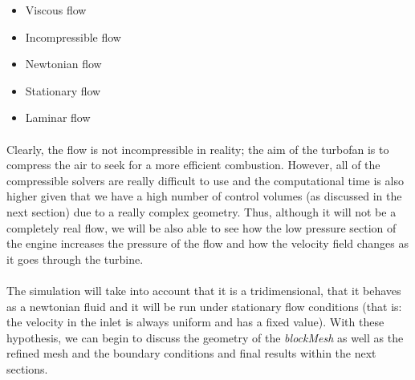 \begin{itemize}
	\item Viscous flow
	\item Incompressible flow
	\item Newtonian flow
	\item Stationary flow
	\item Laminar flow
\end{itemize}

\paragraph{}Clearly, the flow is not incompressible in reality; the aim of the turbofan is to compress the air to seek for a more efficient combustion. However, all of the compressible solvers are really difficult to use and the computational time is also higher given that we have a high number of control volumes (as discussed in the next section) due to a really complex geometry. Thus, although it will not be a completely real flow, we will be also able to see how the low pressure section of the engine increases the pressure of the flow and how the velocity field changes as it goes through the turbine.

\paragraph{}The simulation will take into account that it is a tridimensional, that it behaves as a newtonian fluid and it will be run under stationary flow conditions (that is: the velocity in the inlet is always uniform and has a fixed value). With these hypothesis, we can begin to discuss the geometry of the \textit{blockMesh} as well as the refined mesh and the boundary conditions and final results within the next sections.